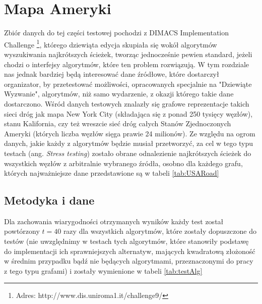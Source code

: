 \section{Mapa Ameryki}

Zbiór danych do tej części testowej pochodzi z \textsf{DIMACS Implementation Challenge} \footnote{Adres: http://www.dis.uniroma1.it/challenge9/}, którego dziewiąta edycja skupiała się wokół algorytmów wyszukiwania najkrótszych ścieżek, tworząc jednocześnie pewien standard, jeżeli chodzi o interfejsy algorytmów, które ten problem rozwiązują. W tym rozdziale nas jednak bardziej będą interesować dane źródłowe, które dostarczył organizator, by przetestować możliwości, opracowanych specjalnie na "Dziewiąte Wyzwanie", algorytmów, niż samo wydarzenie, z okazji którego takie dane dostarczono. Wśród danych testowych znalazły się grafowe reprezentacje takich sieci dróg jak mapa New York City (składająca się z ponad 250 tysięcy węzłów), stanu Kalifornia, czy też wreszcie sieć dróg całych Stanów Zjednoczonych Ameryki (których liczba węzłów sięga prawie 24 milionów). Ze względu na ogrom danych, jakie każdy z algorytmów będzie musiał przetworzyć, za cel w tego typu testach (ang. \textit{Stress testing}) zostało obrane odnalezienie najkrótszych ścieżek do wszystkich węzłów z arbitralnie wybranego źródła, osobno dla każdego grafu, których najważniejsze dane przedstawione są w tabeli \ref{tab:USARoad}

\subsection{Metodyka i dane}

Dla zachowania wiarygodności otrzymanych wyników każdy test został powtórzony $t = 40$ razy dla wszystkich algorytmów, które zostały dopuszczone do testów (nie uwzględnimy w testach tych algorytmów, które stanowiły podstawę do implementacji ich sprawniejszych alternatyw, mających kwadratową złożoność w średnim przypadku bądź nie będących algorytmami, przeznaczonymi do pracy z tego typu grafami) i zostały wymienione w tabeli \ref{tab:testAlg}

